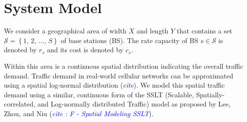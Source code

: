 \documentclass[onecolumn,draftcls]{IEEEtran}
\begin{document}
%




\section{System Model}
We consider a geographical area of width $X$ and length $Y$ that contains a set $\mathcal{S} = \left\{1,\, 2,\, \ldots,\, S\right\}$ of base stations (BS).  The rate capacity of BS $s \in \mathcal{S}$ is denoted by $r_s$ and its cost is denoted by $c_s$.


Within this area is a continuous spatial distribution indicating the overall traffic demand.  Traffic demand in real-world cellular networks can be approximated using a spatial log-normal distribution (\textit{\textcolor{blue}{cite}}).  We model this spatial traffic demand using a similar, continuous form of the SSLT (Scalable, Spatially-correlated, and Log-normally distributed Traffic) model as proposed by Lee, Zhou, and Niu (\textit{\textcolor{blue}{cite : F - Spatial Modeling SSLT}}).
\end{document}
